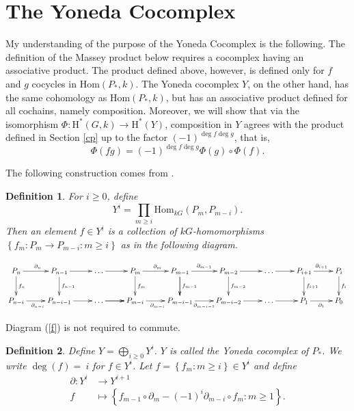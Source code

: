 \documentclass[12pt]{article}
\newtheorem{definition}{Definition}
\begin{document}
\section{The Yoneda Cocomplex}
My understanding of the purpose of the Yoneda Cocomplex
is the following. The definition of the Massey product below
requires a cocomplex having an associative product.
The product defined above,
however, is defined only for $f$ and $g$ cocycles
in $\mathrm{Hom}\left(P_\ast,k\right)$.
The Yoneda cocomplex $Y$, on the other hand, has the same
cohomology as $\mathrm{Hom}\left(P_\ast,k\right)$,
but has an associative product defined 
for all cochains, namely composition.
Moreover, we will show that via the isomorphism 
$\Phi:\mathrm{H}^\ast\left(G,k\right)\to
\mathrm{H}^\ast\left(Y\right)$, composition in $Y$ 
agrees with the product defined in Section \ref{cp}
up to the factor $\left(-1\right)^{\deg f\deg g}$,
that is, \[\Phi\left(fg\right)
=\left(-1\right)^{\deg f\deg g}\Phi\left(g\right)
\circ\Phi\left(f\right).\]

The following construction comes from \cite{borge}.
\begin{definition}
For $i\ge 0$, define
\[Y^i=\prod_{m\ge i}\mathrm{Hom}_{kG}\left(P_m,P_{m-i}\right).\]
Then an element $f\in Y^i$ is a collection of $kG$-homomorphisms
$\left\{f_m:P_m\to P_{m-i}:m\ge i\right\}$
as in the following diagram.

\begin{equation}\label{f}\xymatrix{
P_n\ar[r]^{\partial_n}\ar[d]^{f_n}
&P_{n-1}\ar[r]\ar[d]^{f_{n-1}}
&\dots\ar[r]
&P_m\ar[d]^{f_m}\ar[r]^{\partial_m}
&P_{m-1}\ar[d]\ar[d]^{f_{m-1}}\ar[r]^{\partial_{m-1}}
&P_{m-2}\ar[d]^{f_{m-2}}\ar[r]
&\dots\ar[r]
&P_{i+1}\ar[r]^{\partial_{i+1}}\ar[d]^{f_{i+1}}
&P_i\ar[d]^{f_i}
\\
P_{n-i}\ar[r]_{\partial_{n-i}}
&P_{n-i-1}\ar[r]
&\dots\ar[r]\ar[r]
&P_{m-i}\ar[r]_{\partial_{m-i}}
&P_{m-i-1}\ar[r]_{\partial_{m-i-1}}
&P_{m-i-2}\ar[r]
&\dots\ar[r]
&P_1\ar[r]_{\partial_1}
&P_0
}\end{equation}
\end{definition}
Diagram (\ref{f}) is not required to commute.

\begin{definition}
Define $\displaystyle{Y=\bigoplus_{i\ge 0}Y^i}$.
$Y$ is called the {\em Yoneda cocomplex} of $P_\ast$.
We write $\deg\left(f\right)=~i$ for $f\in Y^i$.
Let $f=\left\{f_m:m\ge i\right\}\in Y^i$ and define 
\begin{align*}
\partial:Y^i&\to Y^{i+1}\\
f&\mapsto\left\{f_{m-1}\circ\partial_m
-\left(-1\right)^i\partial_{m-i}\circ f_m
:m\ge 1\right\}.
\end{align*}
\end{definition}
\end{document}
